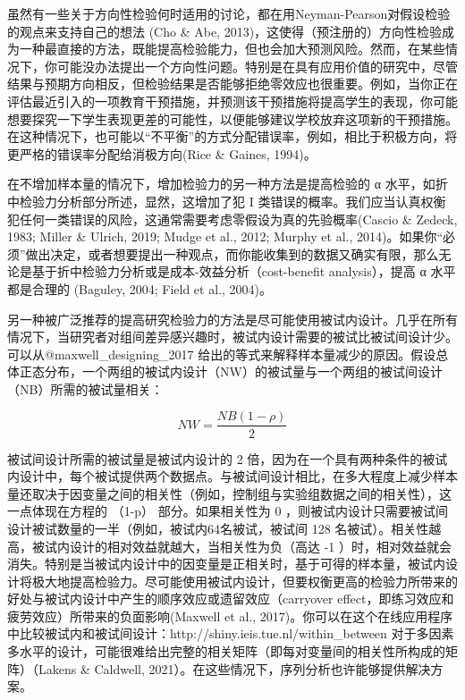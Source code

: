 \documentclass[
  letterpaper,
  DIV=11,
  numbers=noendperiod]{scrreprt}
\begin{document}
虽然有一些关于方向性检验何时适用的讨论，都在用Neyman-Pearson对假设检验的观点来支持自己的想法
(Cho \& Abe,
2013)，这使得（预注册的）方向性检验成为一种最直接的方法，既能提高检验能力，但也会加大预测风险。然而，在某些情况下，你可能没办法提出一个方向性问题。特别是在具有应用价值的研究中，尽管结果与预期方向相反，但检验结果是否能够拒绝零效应也很重要。例如，当你正在评估最近引入的一项教育干预措施，并预测该干预措施将提高学生的表现，你可能想要探究一下学生表现更差的可能性，以便能够建议学校放弃这项新的干预措施。在这种情况下，也可能以``不平衡''的方式分配错误率，例如，相比于积极方向，将更严格的错误率分配给消极方向(Rice
\& Gaines, 1994)。

在不增加样本量的情况下，增加检验力的另一种方法是提高检验的 α
水平，如折中检验力分析部分所述，显然，这增加了犯 I
类错误的概率。我们应当认真权衡犯任何一类错误的风险，这通常需要考虑零假设为真的先验概率(Cascio
\& Zedeck, 1983; Miller \& Ulrich, 2019; Mudge et al., 2012; Murphy et
al.,
2014)。如果你``必须''做出决定，或者想要提出一种观点，而你能收集到的数据又确实有限，那么无论是基于折中检验力分析或是成本-效益分析（cost-benefit
analysis），提高 α 水平都是合理的 (Baguley, 2004; Field et al., 2004)。

另一种被广泛推荐的提高研究检验力的方法是尽可能使用被试内设计。几乎在所有情况下，当研究者对组间差异感兴趣时，被试内设计需要的被试比被试间设计少。可以从@maxwell\_designing\_2017
给出的等式来解释样本量减少的原因。假设总体正态分布，一个两组的被试内设计（NW）的被试量与一个两组的被试间设计（NB）所需的被试量相关：

\[NW = \frac{NB (1-\rho)}{2}\]

被试间设计所需的被试量是被试内设计的 2
倍，因为在一个具有两种条件的被试内设计中，每个被试提供两个数据点。与被试间设计相比，在多大程度上减少样本量还取决于因变量之间的相关性（例如，控制组与实验组数据之间的相关性），这一点体现在方程的
（1-p） 部分。如果相关性为 0
，则被试内设计只需要被试间设计被试数量的一半（例如，被试内64名被试，被试间
128 名被试）。相关性越高，被试内设计的相对效益就越大，当相关性为负（高达
-1
）时，相对效益就会消失。特别是当被试内设计中的因变量是正相关时，基于可得的样本量，被试内设计将极大地提高检验力。尽可能使用被试内设计，但要权衡更高的检验力所带来的好处与被试内设计中产生的顺序效应或遗留效应（carryover
effect，即练习效应和疲劳效应）所带来的负面影响(Maxwell et al.,
2017)。你可以在这个在线应用程序中比较被试内和被试间设计：http://shiny.ieis.tue.nl/within\_between
对于多因素多水平的设计，可能很难给出完整的相关矩阵（即每对变量间的相关性所构成的矩阵）（Lakens
\& Caldwell, 2021）。在这些情况下，序列分析也许能够提供解决方案。
\end{document}
